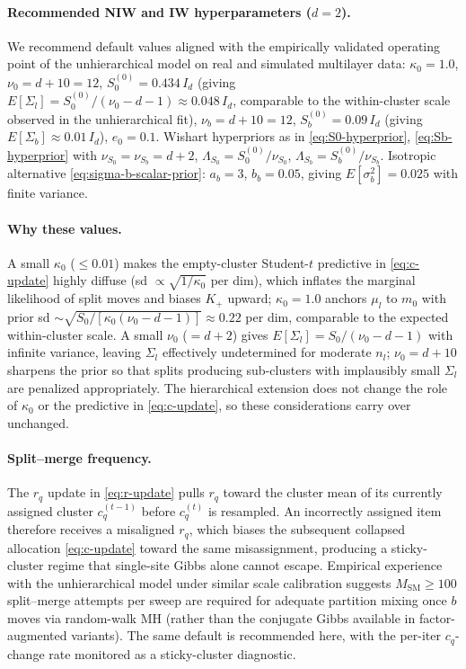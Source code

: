 \documentclass[11pt]{article}
\begin{document}
\paragraph{Recommended NIW and IW hyperparameters ($d=2$).}
We recommend default values aligned with the empirically validated
operating point of the unhierarchical model on real and simulated
multilayer data: $\kappa_0=1.0$, $\nu_0=d+10=12$,
$S_0^{(0)}=0.434\,I_d$ (giving
$E[\Sigma_l]=S_0^{(0)}/(\nu_0-d-1)\approx 0.048\,I_d$, comparable to
the within-cluster scale observed in the unhierarchical fit),
$\nu_b=d+10=12$, $S_b^{(0)}=0.09\,I_d$ (giving
$E[\Sigma_b]\approx 0.01\,I_d$), $e_0=0.1$.  Wishart hyperpriors as in
\eqref{eq:S0-hyperprior}, \eqref{eq:Sb-hyperprior} with
$\nu_{S_0}=\nu_{S_b}=d+2$, $\Lambda_{S_0}=S_0^{(0)}/\nu_{S_0}$,
$\Lambda_{S_b}=S_b^{(0)}/\nu_{S_b}$.  Isotropic alternative
\eqref{eq:sigma-b-scalar-prior}: $a_b=3$, $b_b=0.05$, giving
$E[\sigma_b^2]=0.025$ with finite variance.

\paragraph{Why these values.}
A small $\kappa_0$ ($\leq 0.01$) makes the empty-cluster Student-$t$
predictive in \eqref{eq:c-update} highly diffuse (sd
$\propto\sqrt{1/\kappa_0}$ per dim), which inflates the marginal
likelihood of split moves and biases $K_+$ upward; $\kappa_0=1.0$
anchors $\mu_l$ to $m_0$ with prior sd
$\sim\sqrt{S_0/[\kappa_0(\nu_0-d-1)]}\approx 0.22$ per dim, comparable
to the expected within-cluster scale.  A small $\nu_0$ ($=d+2$) gives
$E[\Sigma_l]=S_0/(\nu_0-d-1)$ with infinite variance, leaving
$\Sigma_l$ effectively undetermined for moderate $n_l$; $\nu_0=d+10$
sharpens the prior so that splits producing sub-clusters with
implausibly small $\Sigma_l$ are penalized appropriately.  The
hierarchical extension does not change the role of $\kappa_0$ or the
predictive in \eqref{eq:c-update}, so these considerations carry over
unchanged.

\paragraph{Split--merge frequency.}
The $r_q$ update in \eqref{eq:r-update} pulls $r_q$ toward the cluster
mean of its currently assigned cluster $c_q^{(t-1)}$ before
$c_q^{(t)}$ is resampled.  An incorrectly assigned item therefore
receives a misaligned $r_q$, which biases the subsequent collapsed
allocation \eqref{eq:c-update} toward the same misassignment,
producing a sticky-cluster regime that single-site Gibbs alone cannot
escape.  Empirical experience with the unhierarchical model under
similar scale calibration suggests $M_{\mathrm{SM}}\geq 100$
split--merge attempts per sweep are required for adequate partition
mixing once $b$ moves via random-walk MH (rather than the conjugate
Gibbs available in factor-augmented variants).  The same default is
recommended here, with the per-iter $c_q$-change rate monitored as a
sticky-cluster diagnostic.
\end{document}
